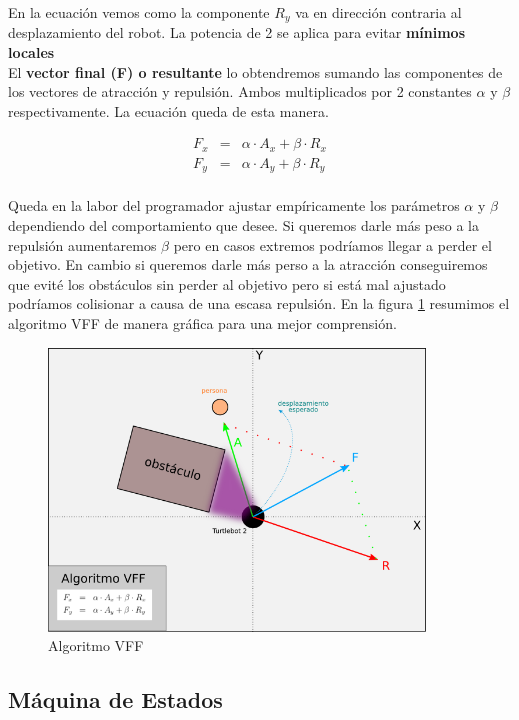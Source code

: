 En la ecuación vemos como la componente $R_y$ va en dirección contraria al desplazamiento del robot. La potencia de 2 se aplica para evitar \textbf{mínimos locales}\\

El \textbf{vector final (F) o resultante} lo obtendremos sumando las componentes de los vectores de atracción y repulsión. Ambos multiplicados por 2 constantes $\alpha$ y $\beta$ respectivamente. La ecuación queda de esta manera.

\begin{eqnarray*}
F_x &=& \alpha \cdot A_x + \beta \cdot R_x\\
F_y &=& \alpha \cdot A_y + \beta \cdot R_y\\
\end{eqnarray*}

Queda en la labor del programador ajustar empíricamente los parámetros $\alpha$ y $\beta$ dependiendo del comportamiento que desee. Si queremos darle más peso a la repulsión aumentaremos $\beta$ pero en casos extremos podríamos llegar a perder el objetivo. En cambio si queremos darle más perso a la atracción conseguiremos que evité los obstáculos sin perder al objetivo pero si está mal ajustado podríamos colisionar a causa de una escasa repulsión. En la figura \ref{fig:esquema_vff} resumimos el algoritmo VFF de manera gráfica para una mejor comprensión.\\

\begin{figure} [H]
  \begin{center}
    \includegraphics[width=10cm]{imagenes/esquema-vff.png}
  \end{center}
  \caption[Algoritmo VFF]{Algoritmo VFF}
  \label{fig:esquema_vff}
\end{figure}


\subsection{Máquina de Estados}
\label{subsec:maquina_estados}
 

